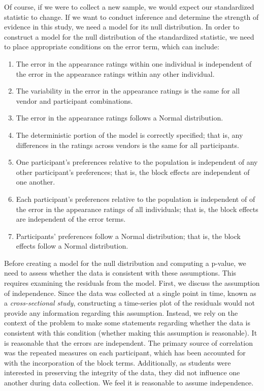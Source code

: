 \documentclass[
  letterpaper,
  DIV=11,
  numbers=noendperiod]{scrreprt}
\providecommand{\tightlist}{%
  \setlength{\itemsep}{0pt}\setlength{\parskip}{0pt}}\usepackage{longtable,booktabs,array}
\theoremstyle{plain}
\theoremstyle{definition}
\theoremstyle{definition}
\theoremstyle{remark}
\begin{document}
Of course, if we were to collect a new sample, we would expect our
standardized statistic to change. If we want to conduct inference and
determine the strength of evidence in this study, we need a model for
its null distribution. In order to construct a model for the null
distribution of the standardized statistic, we need to place appropriate
conditions on the error term, which can include:

\begin{enumerate}
\def\labelenumi{\arabic{enumi}.}
\tightlist
\item
  The error in the appearance ratings within one individual is
  independent of the error in the appearance ratings within any other
  individual.
\item
  The variability in the error in the appearance ratings is the same for
  all vendor and participant combinations.
\item
  The error in the appearance ratings follows a Normal distribution.
\item
  The deterministic portion of the model is correctly specified; that
  is, any differences in the ratings across vendors is the same for all
  participants.
\item
  One participant's preferences relative to the population is
  independent of any other participant's preferences; that is, the block
  effects are independent of one another.
\item
  Each participant's preferences relative to the population is
  independent of of the error in the appearance ratings of all
  individuals; that is, the block effects are independent of the error
  terms.
\item
  Participants' preferences follow a Normal distribution; that is, the
  block effects follow a Normal distribution.
\end{enumerate}

Before creating a model for the null distribution and computing a
p-value, we need to assess whether the data is consistent with these
assumptions. This requires examining the residuals from the model.
First, we discuss the assumption of independence. Since the data was
collected at a single point in time, known as a \emph{cross-sectional
study}, constructing a time-series plot of the residuals would not
provide any information regarding this assumption. Instead, we rely on
the context of the problem to make some statements regarding whether the
data is consistent with this condition (whether making this assumption
is reasonable). It is reasonable that the errors are independent. The
primary source of correlation was the repeated measures on each
participant, which has been accounted for with the incorporation of the
block terms. Additionally, as students were interested in preserving the
integrity of the data, they did not influence one another during data
collection. We feel it is reasonable to assume independence.
\end{document}
